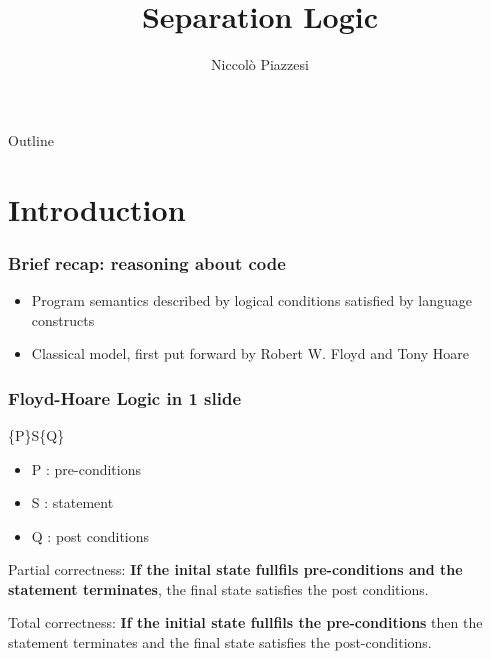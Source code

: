 \documentclass[professionalfont]{beamer}
\title{Separation Logic}
\author{Niccolò Piazzesi}
\institute[UniPi]{
    Università degli studi di Pisa \\
    Anno Accademico 2021-22
}
\begin{document}
    \begin{frame}
        \maketitle
    \end{frame}
    \begin{frame}{Outline}
        \tableofcontents[hideallsubsections]
    \end{frame}
    \section{Introduction}
    \begin{frame}
            \frametitle{Brief recap: reasoning about code}
            
            \begin{itemize}
                \item Program semantics described by logical conditions satisfied by language constructs
                \item Classical model, first put forward by Robert W. Floyd and Tony Hoare
            \end{itemize}
            
        
    \end{frame}
    \begin{frame}
        \frametitle{Floyd-Hoare Logic in 1 slide}
        \begin{center}
            \huge
            \{P\}S\{Q\}
        \end{center}
        \begin{itemize}
            \item P : pre-conditions
            \item S : statement
            \item Q : post conditions
        \end{itemize}
        \bigskip
        
        Partial correctness: \textbf{If the inital state fullfils pre-conditions and the statement terminates}, the final state satisfies the post conditions.
        \medskip

        Total correctness: \textbf{If the initial state fullfils the pre-conditions} then the statement terminates and the final state satisfies the post-conditions.
    \end{frame}
\end{document}

